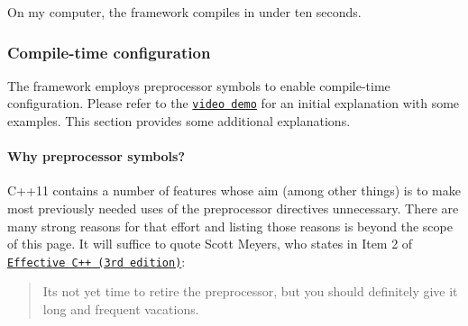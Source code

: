On my computer, the framework compiles in under ten seconds.\hypertarget{index_s-symbols}{}\subsubsection{Compile-\/time configuration}\label{index_s-symbols}
The framework employs preprocessor symbols to enable compile-\/time configuration. Please refer to the \href{https://youtu.be/cElxLWve1Zw}{\tt video demo} for an initial explanation with some examples. This section provides some additional explanations.\hypertarget{index_s-why-symbols}{}\paragraph{Why preprocessor symbols?}\label{index_s-why-symbols}
{\ttfamily C++11} contains a number of features whose aim (among other things) is to make most previously needed uses of the preprocessor directives unnecessary. There are many strong reasons for that effort and listing those reasons is beyond the scope of this page. It will suffice to quote Scott Meyers, who states in {\ttfamily Item 2} of \href{http://amzn.com/0321334876}{\tt Effective C++ (3rd edition)}\+: \begin{quote}
It\textquotesingle{}s not yet time to retire the preprocessor, but you should definitely give it long and frequent vacations. \end{quote}


